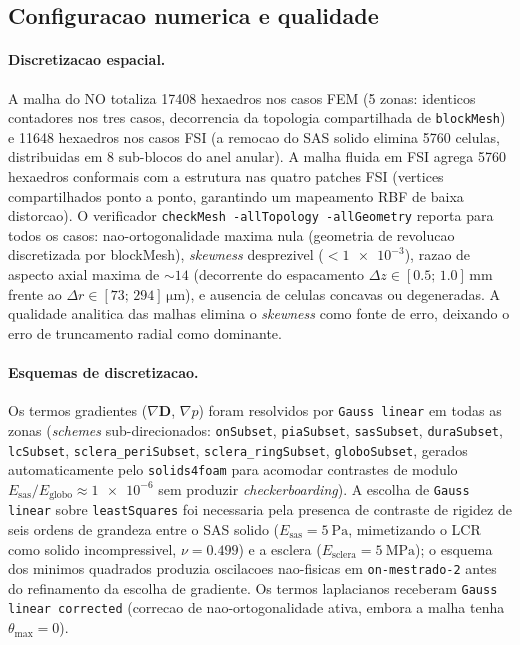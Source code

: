 \subsection{Configuracao numerica e qualidade}
\label{sec:resultados-numerica}

\paragraph{Discretizacao espacial.} A malha do NO totaliza \num{17408} hexaedros nos casos FEM (5 zonas: identicos contadores nos tres casos, decorrencia da topologia compartilhada de \texttt{blockMesh}) e \num{11648} hexaedros nos casos FSI (a remocao do SAS solido elimina \num{5760} celulas, distribuidas em 8 sub-blocos do anel anular). A malha fluida em FSI agrega \num{5760} hexaedros conformais com a estrutura nas quatro patches FSI (vertices compartilhados ponto a ponto, garantindo um mapeamento RBF de baixa distorcao). O verificador \texttt{checkMesh -allTopology -allGeometry} reporta para todos os casos: nao-ortogonalidade maxima nula (geometria de revolucao discretizada por blockMesh), \emph{skewness} desprezivel ($< \num{1e-3}$), razao de aspecto axial maxima de $\sim 14$ (decorrente do espacamento $\Delta z \in [\num{0.5};\, \num{1.0}]\,\si{\milli\meter}$ frente ao $\Delta r \in [\num{73};\, \num{294}]\,\si{\micro\meter}$), e ausencia de celulas concavas ou degeneradas. A qualidade analitica das malhas elimina o \emph{skewness} como fonte de erro, deixando o erro de truncamento radial como dominante.

\paragraph{Esquemas de discretizacao.} Os termos gradientes ($\nabla \mathbf{D}$, $\nabla p$) foram resolvidos por \texttt{Gauss linear} em todas as zonas (\emph{schemes} sub-direcionados: \texttt{onSubset}, \texttt{piaSubset}, \texttt{sasSubset}, \texttt{duraSubset}, \texttt{lcSubset}, \texttt{sclera\_periSubset}, \texttt{sclera\_ringSubset}, \texttt{globoSubset}, gerados automaticamente pelo \texttt{solids4foam} para acomodar contrastes de modulo $E_{\mathrm{sas}}/E_{\mathrm{globo}} \approx \num{1e-6}$ sem produzir \emph{checkerboarding}). A escolha de \texttt{Gauss linear} sobre \texttt{leastSquares} foi necessaria pela presenca de contraste de rigidez de seis ordens de grandeza entre o SAS solido ($E_{\mathrm{sas}} = \SI{5}{\pascal}$, mimetizando o LCR como solido incompressivel, $\nu = \num{0.499}$) e a esclera ($E_{\mathrm{sclera}} = \SI{5}{\mega\pascal}$); o esquema dos minimos quadrados produzia oscilacoes nao-fisicas em \texttt{on-mestrado-2} antes do refinamento da escolha de gradiente. Os termos laplacianos receberam \texttt{Gauss linear corrected} (correcao de nao-ortogonalidade ativa, embora a malha tenha $\theta_{\max} = 0$).

